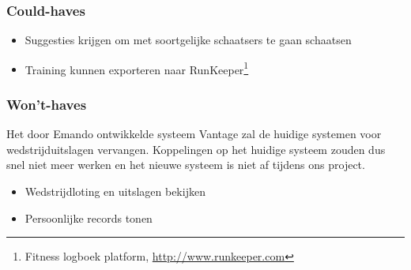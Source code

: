 \subsubsection{Could-haves}
\begin{itemize}
\item Suggesties krijgen om met soortgelijke schaatsers te gaan schaatsen
\item Training kunnen exporteren naar RunKeeper\footnote{Fitness logboek platform, \url{http://www.runkeeper.com}}
\end{itemize}

\subsubsection{Won't-haves}
Het door Emando ontwikkelde systeem Vantage zal de huidige systemen voor wedstrijduitslagen vervangen. Koppelingen op het huidige systeem zouden dus snel niet meer werken en het nieuwe systeem is niet af tijdens ons project.
\begin{itemize}
    \item Wedstrijdloting en uitslagen bekijken
    \item Persoonlijke records tonen
\end{itemize}